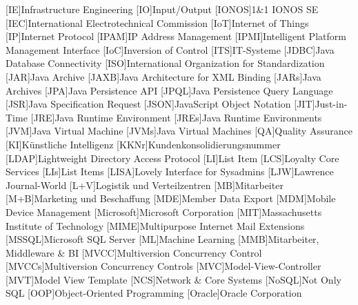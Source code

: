 \begin{acronym}[]
        [IE]{Infrastructure Engineering}
        [IO]{Input/Output}
        [IONOS]{1\&1 IONOS SE}
        [IEC]{International Electrotechnical Commission}
        [IoT]{Internet of Things}
        [IP]{Internet Protocol}
        [IPAM]{IP Address Management}
        [IPMI]{Intelligent Platform Management Interface}
        [IoC]{Inversion of Control}
        [ITS]{IT-Systeme}
        [JDBC]{Java Database Connectivity}
        [ISO]{International Organization for Standardization}
        [JAR]{Java Archive}
        [JAXB]{Java Architecture for XML Binding}
        [JARs]{Java Archives}
        [JPA]{Java Persistence API}
        [JPQL]{Java Persistence Query Language}
        [JSR]{Java Specification Request}
        [JSON]{JavaScript Object Notation}
        [JIT]{Just-in-Time}
        [JRE]{Java Runtime Environment}
        [JREs]{Java Runtime Environments}
        [JVM]{Java Virtual Machine}
        [JVMs]{Java Virtual Machines}
        [QA]{Quality Assurance}
        [KI]{Künstliche Intelligenz}
        [KKNr]{Kundenkonsolidierungsnummer}
        [LDAP]{Lightweight Directory Access Protocol}
        [LI]{List Item}
        [LCS]{Loyalty Core Services}
        [LIs]{List Items}
        [LISA]{Lovely Interface for Sysadmins}
        [LJW]{Lawrence Journal-World}
        [L+V]{Logistik und Verteilzentren}
        [MB]{Mitarbeiter}
        [M+B]{Marketing und Beschaffung}
        [MDE]{Member Data Export}
        [MDM]{Mobile Device Management}
        [Microsoft]{Microsoft Corporation}
        [MIT]{Massachusetts Institute of Technology}
        [MIME]{Multipurpose Internet Mail Extensions}
        [MSSQL]{Microsoft SQL Server}
        [ML]{Machine Learning}
        [MMB]{Mitarbeiter, Middleware \& BI}
        [MVCC]{Multiversion Concurrency Control}
        [MVCCs]{Multiversion Concurrency Controls}
        [MVC]{Model-View-Controller}
        [MVT]{Model View Template}
        [NCS]{Network \& Core Systems}
        [NoSQL]{Not Only SQL}
        [OOP]{Object-Oriented Programming}
        [Oracle]{Oracle Corporation}

\end{acronym}
